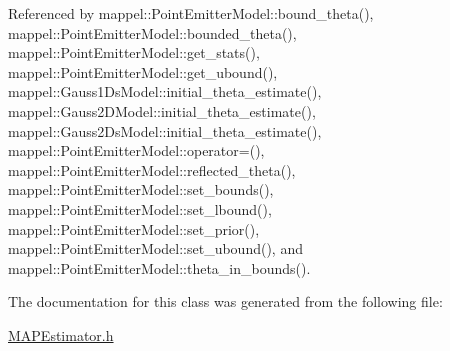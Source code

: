 Referenced by mappel\+::\+Point\+Emitter\+Model\+::bound\+\_\+theta(), mappel\+::\+Point\+Emitter\+Model\+::bounded\+\_\+theta(), mappel\+::\+Point\+Emitter\+Model\+::get\+\_\+stats(), mappel\+::\+Point\+Emitter\+Model\+::get\+\_\+ubound(), mappel\+::\+Gauss1\+Ds\+Model\+::initial\+\_\+theta\+\_\+estimate(), mappel\+::\+Gauss2\+D\+Model\+::initial\+\_\+theta\+\_\+estimate(), mappel\+::\+Gauss2\+Ds\+Model\+::initial\+\_\+theta\+\_\+estimate(), mappel\+::\+Point\+Emitter\+Model\+::operator=(), mappel\+::\+Point\+Emitter\+Model\+::reflected\+\_\+theta(), mappel\+::\+Point\+Emitter\+Model\+::set\+\_\+bounds(), mappel\+::\+Point\+Emitter\+Model\+::set\+\_\+lbound(), mappel\+::\+Point\+Emitter\+Model\+::set\+\_\+prior(), mappel\+::\+Point\+Emitter\+Model\+::set\+\_\+ubound(), and mappel\+::\+Point\+Emitter\+Model\+::theta\+\_\+in\+\_\+bounds().



The documentation for this class was generated from the following file\+:\begin{DoxyCompactItemize}
\item 
\hyperlink{MAPEstimator_8h}{M\+A\+P\+Estimator.\+h}\end{DoxyCompactItemize}
